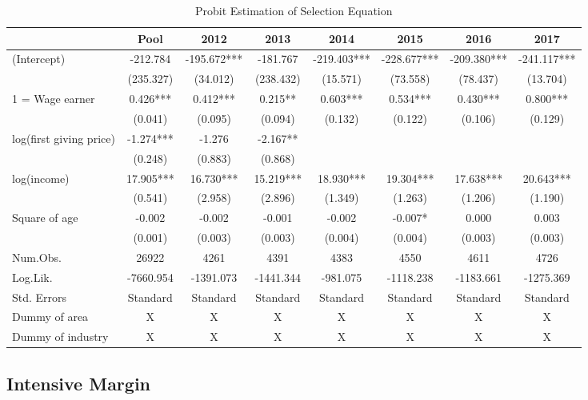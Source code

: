 \documentclass[
  11pt,
  a4paper,
]{article}
\begin{document}
\begin{table}

\caption{\label{tab:stage1}Probit Estimation of Selection Equation}
\centering
\begin{tabular}[t]{lccccccc}
\toprule
  & Pool & 2012 & 2013 & 2014 & 2015 & 2016 & 2017\\
\midrule
(Intercept) & -212.784 & -195.672*** & -181.767 & -219.403*** & -228.677*** & -209.380*** & -241.117***\\
 & (235.327) & (34.012) & (238.432) & (15.571) & (73.558) & (78.437) & (13.704)\\
1 = Wage earner & 0.426*** & 0.412*** & 0.215** & 0.603*** & 0.534*** & 0.430*** & 0.800***\\
 & (0.041) & (0.095) & (0.094) & (0.132) & (0.122) & (0.106) & (0.129)\\
log(first giving price) & -1.274*** & -1.276 & -2.167** &  &  &  & \\
 & (0.248) & (0.883) & (0.868) &  &  &  & \\
log(income) & 17.905*** & 16.730*** & 15.219*** & 18.930*** & 19.304*** & 17.638*** & 20.643***\\
 & (0.541) & (2.958) & (2.896) & (1.349) & (1.263) & (1.206) & (1.190)\\
Square of age & -0.002 & -0.002 & -0.001 & -0.002 & -0.007* & 0.000 & 0.003\\
 & (0.001) & (0.003) & (0.003) & (0.004) & (0.004) & (0.003) & (0.003)\\
\midrule
Num.Obs. & 26922 & 4261 & 4391 & 4383 & 4550 & 4611 & 4726\\
Log.Lik. & -7660.954 & -1391.073 & -1441.344 & -981.075 & -1118.238 & -1183.661 & -1275.369\\
Std. Errors & Standard & Standard & Standard & Standard & Standard & Standard & Standard\\
Dummy of area & X & X & X & X & X & X & X\\
Dummy of industry & X & X & X & X & X & X & X\\
\bottomrule
\end{tabular}
\end{table}

\hypertarget{intensive-margin}{%
\subsection{Intensive Margin}\label{intensive-margin}}
\end{document}
